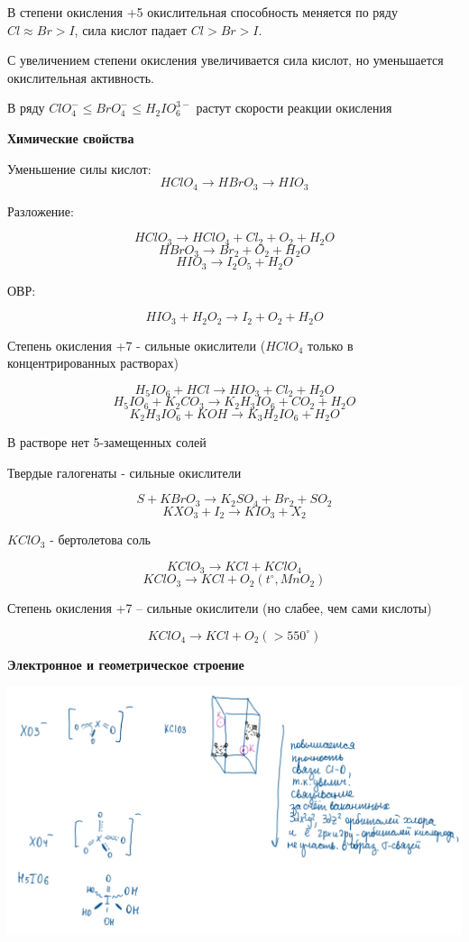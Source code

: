 В степени окисления +5 окислительная способность меняется по ряду $Cl\approx Br > I$, сила кислот падает $Cl>Br>I$.

С увеличением степени окисления увеличивается сила кислот, но уменьшается окислительная активность.

В ряду $ClO_4^-\leq BrO_4^- \leq H_2IO_6^{3-}$ растут скорости реакции окисления

\textbf{Химические свойства}

Уменьшение силы кислот:
$$HClO_4 \rightarrow HBrO_3 \rightarrow HIO_3$$

Разложение:

$$HClO_3 \rightarrow HClO_4 + Cl_2 + O_2 + H_2O$$
$$HBrO_3 \rightarrow Br_2 + O_2 + H_2O$$
$$HIO_3 \rightarrow I_2O_5 + H_2O$$

ОВР: 

$$HIO_3 + H_2O_2 \rightarrow I_2 + O_2 + H_2O$$

Степень окисления +7 - сильные окислители ($HClO_4$ только в концентрированных растворах)

$$H_5IO_6 + HCl \rightarrow HIO_3 + Cl_2 + H_2O$$
$$H_5IO_6 + K_2CO_3 \rightarrow K_2H_3IO_6 + CO_2 + H_2O$$
$$K_2H_3IO_6 + KOH \rightarrow K_3H_2IO_6 + H_2O$$

В растворе нет 5-замещенных солей

Твердые галогенаты - сильные окислители

$$S + KBrO_3 \rightarrow K_2SO_4 + Br_2 + SO_2$$
$$KXO_3 + I_2 \rightarrow KIO_3 + X_2$$
 
$KClO_3$ - бертолетова соль

$$KClO_3 \rightarrow KCl + KClO_4$$
$$KClO_3 \rightarrow KCl + O_2 (t^{\circ}, MnO_2)$$

Степень окисления +7 -- сильные окислители (но слабее, чем сами кислоты)

$$KClO_4 \rightarrow KCl + O_2 (>550^{\circ})$$

\textbf{Электронное и геометрическое строение}

\includegraphics[scale=0.7]{images/5v5.png}
